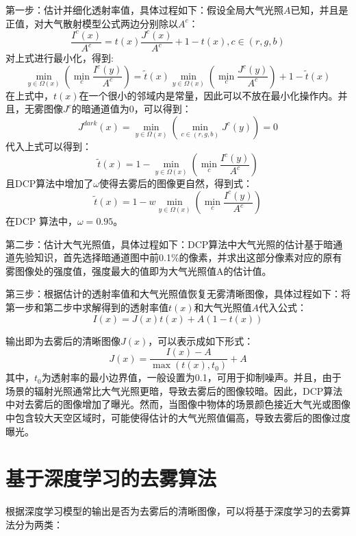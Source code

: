 \documentclass[12pt]{article}
\begin{document}
第一步：估计并细化透射率值，具体过程如下：假设全局大气光照$A$已知，并且是正值，对大气散射模型公式两边分别除以$A^c$：
\begin{equation}
    \frac{I^{c}(x)}{A^{c}}=t(x) \frac{J^{c}(x)}{A^{c}}+1-t(x), c \in(r, g, b)
\end{equation}
对上式进行最小化，得到:
\begin{equation}
    \min _{y \in \Omega(x)}\left(\min _{c} \frac{I^{c}(y)}{A^{c}}\right)=\tilde{t}(x) \min _{y \in \Omega(x)}\left(\min _{c} \frac{J^{c}(y)}{A^{c}}\right)+1-\tilde{t}(x)
\end{equation}
在上式中，$t(x)$在一个很小的邻域内是常量，因此可以不放在最小化操作内。并且，无雾图像$J^c$的暗通道值为0，可以得到：
\begin{equation}
    J^{dark}(x)=\min _{y \in \Omega(x)}\left(\min _{c \in(r, g, b)} J^{c}(y)\right)=0
\end{equation}
代入上式可以得到：
\begin{equation}\tilde{t}(x)=1-\min _{y \in \Omega(x)}\left(\min _{c} \frac{I^{c}(y)}{A^{c}}\right)\end{equation}
且DCP算法中增加了$\omega$使得去雾后的图像更自然，得到式：
\begin{equation}\tilde{t}(x)=1-w \min _{y \in \Omega(x)}\left(\min _{c} \frac{I^{c}(y)}{A^{c}}\right)\end{equation}
在DCP 算法中，$\omega=0.95$。

第二步：估计大气光照值，具体过程如下：DCP算法中大气光照的估计基于暗通道先验知识，首先选择暗通道图中前0.1\%的像素，并求出这部分像素对应的原有雾图像处的强度值，强度最大的值即为大气光照值A的估计值。

第三步：根据估计的透射率值和大气光照值恢复无雾清晰图像，具体过程如下：将第一步和第二步中求解得到的透射率值$t(x)$和大气光照值$A$代入公式：
\begin{equation}
    I(x)=J(x) t(x)+A(1-t(x))
\end{equation}

输出即为去雾后的清晰图像$J(x)$，可以表示成如下形式：
\begin{equation}J(x)=\frac{I(x)-A}{\max \left(t(x), t_{0}\right)}+A\end{equation}
其中，$t_0$为透射率的最小边界值，一般设置为0.1，可用于抑制噪声。并且，由于场景的辐射光照通常比大气光照更暗，导致去雾后的图像较暗。因此，DCP算法中对去雾后的图像增加了曝光。然而，当图像中物体的场景颜色接近大气光或图像中包含较大天空区域时，可能使得估计的大气光照值偏高，导致去雾后的图像过度曝光。

\section{基于深度学习的去雾算法}
根据深度学习模型的输出是否为去雾后的清晰图像，可以将基于深度学习的去雾算法分为两类：
\end{document}

